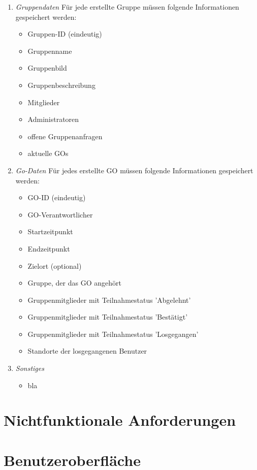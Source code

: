\documentclass[parskip=full]{scrartcl}
\def\threedigits#1{%
  \ifnum#1<100 0\fi
  \ifnum#1<10 0\fi
  \number#1}
\begin{document}
\begin{enumerate}[label={\textbf{/D\protect\threedigits{\theenumi}0/}}, leftmargin=*]
	\item \textit{Gruppendaten} Für jede erstellte Gruppe müssen folgende Informationen gespeichert werden:
	\begin{itemize}
		\item Gruppen-ID (eindeutig)
		\item Gruppenname
		\item Gruppenbild
		\item Gruppenbeschreibung
		\item Mitglieder
		\item Administratoren
		\item offene Gruppenanfragen %
		\item aktuelle GOs
	\end{itemize}
	\item \textit{Go-Daten} \label{GO-Daten}
	Für jedes erstellte GO müssen folgende Informationen gespeichert werden:
	\begin{itemize}
		\item GO-ID (eindeutig)
		\item GO-Verantwortlicher
		\item Startzeitpunkt
		\item Endzeitpunkt
		\item Zielort (optional)
		\item Gruppe, der das GO angehört
		\item Gruppenmitglieder mit Teilnahmestatus 'Abgelehnt'
		\item Gruppenmitglieder mit Teilnahmestatus 'Bestätigt'
		\item Gruppenmitglieder mit Teilnahmestatus 'Losgegangen'
		\item Standorte der losgegangenen Benutzer
	\end{itemize}
	\item \textit{Sonstiges}
		\begin{itemize}
			\item bla
		\end{itemize}
\end{enumerate}

\newpage
\section{Nichtfunktionale Anforderungen}

\newpage
\section{Benutzeroberfläche}
\end{document}
